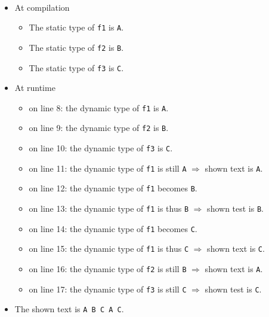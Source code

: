 \paragraph{}
\begin{itemize}
 \item At compilation
 \begin{itemize}
  \item The static type of \texttt{f1} is \texttt{A}.
  \item The static type of \texttt{f2} is \texttt{B}.
  \item The static type of \texttt{f3} is \texttt{C}.
 \end{itemize}
 \item At runtime
 \begin{itemize}
  \item on line 8: the dynamic type of \texttt{f1} is \texttt{A}.
  \item on line 9: the dynamic type of \texttt{f2} is \texttt{B}.
  \item on line 10: the dynamic type of \texttt{f3} is \texttt{C}.
  \item on line 11: the dynamic type of \texttt{f1} is still \texttt{A}
$\Rightarrow$ shown text is \texttt{A}.
  \item on line 12: the dynamic type of \texttt{f1} becomes \texttt{B}.
  \item on line 13: the dynamic type of \texttt{f1} is thus \texttt{B}
$\Rightarrow$ shown test is \texttt{B}.
  \item on line 14: the dynamic type of \texttt{f1} becomes \texttt{C}.
  \item on line 15: the dynamic type of \texttt{f1} is thus \texttt{C}
$\Rightarrow$ shown text is \texttt{C}.
  \item on line 16: the dynamic type of \texttt{f2} is still \texttt{B}
$\Rightarrow$ shown text is \texttt{A}.
  \item on line 17: the dynamic type of \texttt{f3} is still \texttt{C}
$\Rightarrow$ shown test is \texttt{C}.
 \end{itemize}
 \item The shown text is \texttt{A B C A C}.
\end{itemize}
